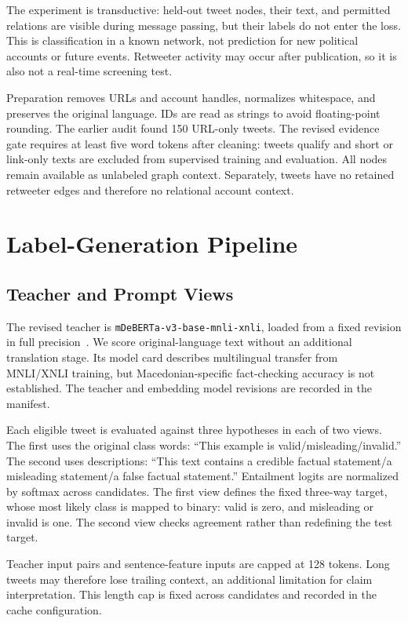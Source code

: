 \documentclass[conference]{IEEEtran}
\begin{document}
The experiment is transductive: held-out tweet nodes, their text, and permitted relations are visible during message passing, but their labels do not enter the loss. This is classification in a known network, not prediction for new political accounts or future events. Retweeter activity may occur after publication, so it is also not a real-time screening test.

Preparation removes URLs and account handles, normalizes whitespace, and preserves the original language. IDs are read as strings to avoid floating-point rounding. The earlier audit found 150 URL-only tweets. The revised evidence gate requires at least five word tokens after cleaning: \NumEligible{} tweets qualify and \NumIneligible{} short or link-only texts are excluded from supervised training and evaluation. All nodes remain available as unlabeled graph context. Separately, \NumIsolated{} tweets have no retained retweeter edges and therefore no relational account context.

\section{Label-Generation Pipeline}
\subsection{Teacher and Prompt Views}
The revised teacher is \texttt{mDeBERTa-v3-base-mnli-xnli}, loaded from a fixed revision in full precision~\cite{laurer}. We score original-language text without an additional translation stage. Its model card describes multilingual transfer from MNLI/XNLI training, but Macedonian-specific fact-checking accuracy is not established. The teacher and embedding model revisions are recorded in the manifest.

Each eligible tweet is evaluated against three hypotheses in each of two views. The first uses the original class words: ``This example is valid/misleading/invalid.'' The second uses descriptions: ``This text contains a credible factual statement/a misleading statement/a false factual statement.'' Entailment logits are normalized by softmax across candidates. The first view defines the fixed three-way target, whose most likely class is mapped to binary: valid is zero, and misleading or invalid is one. The second view checks agreement rather than redefining the test target.

Teacher input pairs and sentence-feature inputs are capped at 128 tokens. Long tweets may therefore lose trailing context, an additional limitation for claim interpretation. This length cap is fixed across candidates and recorded in the cache configuration.
\end{document}
